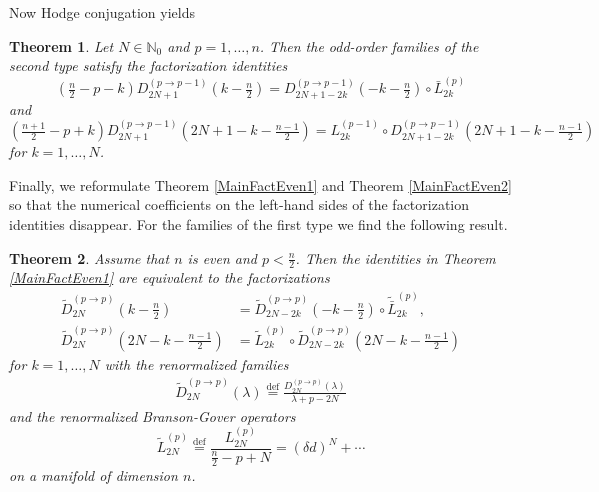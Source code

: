 \documentclass[a4paper,12pt,reqno]{amsart}
\newtheorem{theorem}{Theorem}
\numberwithin{theorem}{subsection}
\numberwithin{equation}{section}
\begin{document}
Now Hodge conjugation yields

\begin{theorem}\label{MainFactOdd2} Let $N \in {\mathbb{N}}_0$ and $p=1,\dots,n$. Then the
odd-order families of the second type satisfy the factorization identities
\begin{equation}\label{main-fact-odd-3}
   (\tfrac{n}{2}\!-\!p\!-\!k) D_{2N+1}^{(p\to p-1)} (k\!-\!\tfrac{n}{2})
   = D_{2N+1-2k}^{(p\to p-1)}(-k\!-\!\tfrac{n}{2}) \circ \bar{L}_{2k}^{(p)}
\end{equation}
and
\begin{equation}\label{main-fact-odd-4}
   (\tfrac{n+1}{2}\!-\!p+\!k\!) D_{2N+1}^{(p\to p-1)}(2N\!+\!1\!-\!k\!-\!\tfrac{n-1}{2}) =
   L_{2k}^{(p-1)} \circ D_{2N+1-2k}^{(p\to p-1)}(2N\!+\!1\!-\!k\!-\!\tfrac{n-1}{2})
\end{equation}
for $k=1,\dots,N$.
\end{theorem}

Finally, we reformulate Theorem \ref{MainFactEven1} and Theorem
\ref{MainFactEven2} so that the numerical coefficients on the left-hand sides
of the factorization identities disappear. For the families of the first type
we find the following result.

\begin{theorem}\label{MainFactEven1-re} Assume that $n$ is even and $p < \frac{n}{2}$. Then the identities
in Theorem \ref{MainFactEven1} are equivalent to the factorizations
\begin{align}
   \tilde{D}_{2N}^{(p \to p)}(k\!-\!\tfrac{n}{2}) & =
   \tilde{D}_{2N-2k}^{(p \to p)}(-k\!-\!\tfrac{n}{2}) \circ \tilde{\bar{L}}_{2k}^{(p)}, \label{reno-1} \\
   \tilde{D}_{2N}^{(p \to p)}(2N\!-\!k\!-\!\tfrac{n-1}{2}) & =
   \tilde{L}_{2k}^{(p)} \circ
   \tilde{D}_{2N-2k}^{(p \to p)}(2N\!-\!k-\!\tfrac{n-1}{2}) \label{reno-2}
\end{align}
for $k=1,\dots,N$ with the renormalized families
\begin{align*}
   \tilde{D}_{2N}^{(p \to p)}(\lambda) {\stackrel{\text{def}}{=}} \frac{D_{2N}^{(p \to p)}(\lambda)}{\lambda\!+\!p\!-\!2N}
\end{align*}
and the renormalized Branson-Gover operators
\begin{equation}\label{BG-reno1}
   \tilde{L}^{(p)}_{2N} {\stackrel{\text{def}}{=}} \frac{L_{2N}^{(p)}}{\frac{n}{2}\!-\!p\!+\!N} =
   (\delta d)^N + \cdots
\end{equation}
on a manifold of dimension $n$.
\end{theorem}
\end{document}
